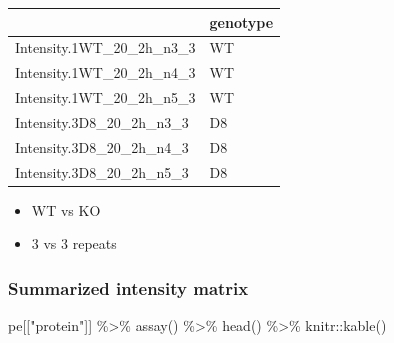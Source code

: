 \documentclass[
]{article}
\newenvironment{Shaded}{\begin{snugshade}}{\end{snugshade}}
\newcommand{\FunctionTok}[1]{\textcolor[rgb]{0.00,0.00,0.00}{#1}}
\newcommand{\NormalTok}[1]{#1}
\newcommand{\SpecialCharTok}[1]{\textcolor[rgb]{0.00,0.00,0.00}{#1}}
\newcommand{\StringTok}[1]{\textcolor[rgb]{0.31,0.60,0.02}{#1}}
\providecommand{\tightlist}{%
  \setlength{\itemsep}{0pt}\setlength{\parskip}{0pt}}
\begin{document}
\begin{longtable}[]{@{}ll@{}}
\toprule
& genotype \\
\midrule
\endhead
Intensity.1WT\_20\_2h\_n3\_3 & WT \\
Intensity.1WT\_20\_2h\_n4\_3 & WT \\
Intensity.1WT\_20\_2h\_n5\_3 & WT \\
Intensity.3D8\_20\_2h\_n3\_3 & D8 \\
Intensity.3D8\_20\_2h\_n4\_3 & D8 \\
Intensity.3D8\_20\_2h\_n5\_3 & D8 \\
\bottomrule
\end{longtable}

\begin{itemize}
\tightlist
\item
  WT vs KO
\item
  3 vs 3 repeats
\end{itemize}

\hypertarget{summarized-intensity-matrix}{%
\subsubsection{Summarized intensity
matrix}\label{summarized-intensity-matrix}}

\begin{Shaded}
\begin{Highlighting}[]
\NormalTok{pe[[}\StringTok{"protein"}\NormalTok{]] }\SpecialCharTok{\%\textgreater{}\%} \FunctionTok{assay}\NormalTok{() }\SpecialCharTok{\%\textgreater{}\%} \FunctionTok{head}\NormalTok{() }\SpecialCharTok{\%\textgreater{}\%}\NormalTok{ knitr}\SpecialCharTok{::}\FunctionTok{kable}\NormalTok{()}
\end{Highlighting}
\end{Shaded}
\end{document}
